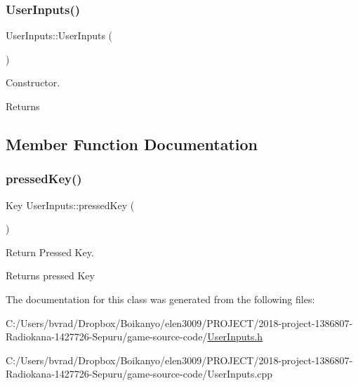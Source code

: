 \subsubsection{\texorpdfstring{User\+Inputs()}{UserInputs()}}
{\footnotesize\ttfamily User\+Inputs\+::\+User\+Inputs (\begin{DoxyParamCaption}{ }\end{DoxyParamCaption})\hspace{0.3cm}{\ttfamily [inline]}}



Constructor. 

\begin{DoxyReturn}{Returns}

\end{DoxyReturn}


\subsection{Member Function Documentation}
\mbox{\label{class_user_inputs_a37ed9f4c956fd8dc4f3bc8a96e61933b}} 
\subsubsection{\texorpdfstring{pressed\+Key()}{pressedKey()}}
{\footnotesize\ttfamily Key User\+Inputs\+::pressed\+Key (\begin{DoxyParamCaption}{ }\end{DoxyParamCaption})}



Return Pressed Key. 

\begin{DoxyReturn}{Returns}
pressed Key 
\end{DoxyReturn}


The documentation for this class was generated from the following files\+:\begin{DoxyCompactItemize}
\item 
C\+:/\+Users/bvrad/\+Dropbox/\+Boikanyo/elen3009/\+P\+R\+O\+J\+E\+C\+T/2018-\/project-\/1386807-\/\+Radiokana-\/1427726-\/\+Sepuru/game-\/source-\/code/\mbox{\hyperlink{_user_inputs_8h}{User\+Inputs.\+h}}\item 
C\+:/\+Users/bvrad/\+Dropbox/\+Boikanyo/elen3009/\+P\+R\+O\+J\+E\+C\+T/2018-\/project-\/1386807-\/\+Radiokana-\/1427726-\/\+Sepuru/game-\/source-\/code/User\+Inputs.\+cpp\end{DoxyCompactItemize}
